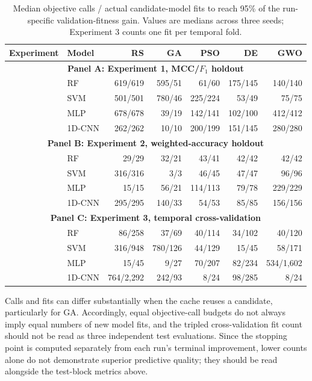 \begin{table}[!htbp]
\centering
\caption{Median objective calls / actual candidate-model fits to reach 95\% of the run-specific validation-fitness gain. Values are medians across three seeds; Experiment 3 counts one fit per temporal fold.}
\label{tab:training_effort}
\manuscripttablestyle
\begin{tabular}{llrrrrr}\toprule
\textbf{Experiment} & \textbf{Model} & \textbf{RS} & \textbf{GA} & \textbf{PSO} & \textbf{DE} & \textbf{GWO}\\\midrule
\multicolumn{7}{c}{\textbf{Panel A: Experiment 1, MCC/$F_1$ holdout}}\\\midrule
 & RF & 619/619 & 595/51 & 61/60 & 175/145 & 140/140\\
 & SVM & 501/501 & 780/46 & 225/224 & 53/49 & 75/75\\
 & MLP & 678/678 & 39/19 & 142/141 & 102/100 & 412/412\\
 & 1D-CNN & 262/262 & 10/10 & 200/199 & 151/145 & 280/280\\\midrule
\multicolumn{7}{c}{\textbf{Panel B: Experiment 2, weighted-accuracy holdout}}\\\midrule
 & RF & 29/29 & 32/21 & 43/41 & 42/42 & 42/42\\
 & SVM & 316/316 & 3/3 & 46/45 & 47/47 & 96/96\\
 & MLP & 15/15 & 56/21 & 114/113 & 79/78 & 229/229\\
 & 1D-CNN & 295/295 & 140/33 & 54/53 & 85/85 & 156/156\\\midrule
\multicolumn{7}{c}{\textbf{Panel C: Experiment 3, temporal cross-validation}}\\\midrule
 & RF & 86/258 & 37/69 & 40/114 & 34/102 & 40/120\\
 & SVM & 316/948 & 780/126 & 44/129 & 15/45 & 58/171\\
 & MLP & 15/45 & 9/27 & 70/207 & 82/234 & 534/1,602\\
 & 1D-CNN & 764/2,292 & 242/93 & 8/24 & 98/285 & 8/24\\\bottomrule
\end{tabular}
\end{table}

Calls and fits can differ substantially when the cache reuses a candidate, particularly for GA. Accordingly, equal objective-call budgets do not always imply equal numbers of new model fits, and the tripled cross-validation fit count should not be read as three independent test evaluations. Since the stopping point is computed separately from each run's terminal improvement, lower counts alone do not demonstrate superior predictive quality; they should be read alongside the test-block metrics above.


